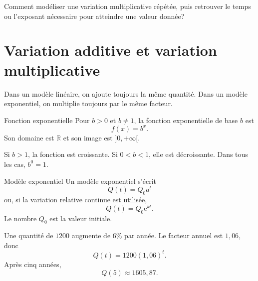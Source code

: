\documentclass[12pt,a4paper,openany]{book}
\newcommand{\R}{\mathbb{R}}
\newcommand{\e}{\mathrm{e}}
\begin{document}
\begin{questionbox}
Comment modéliser une variation multiplicative répétée, puis retrouver le temps ou l'exposant nécessaire pour atteindre une valeur donnée?
\end{questionbox}

\section{Variation additive et variation multiplicative}

\begin{intuitionbox}
Dans un modèle linéaire, on ajoute toujours la même quantité. Dans un modèle exponentiel, on multiplie toujours par le même facteur.
\end{intuitionbox}

\begin{definition}{Fonction exponentielle}{}
Pour $b>0$ et $b\neq1$, la fonction exponentielle de base $b$ est
\[
f(x)=b^x.
\]
Son domaine est $\R$ et son image est $]0,+\infty[$.
\end{definition}

Si $b>1$, la fonction est croissante. Si $0<b<1$, elle est décroissante. Dans tous les cas, $b^0=1$.

\begin{center}
\end{center}

\begin{definition}{Modèle exponentiel}{}
Un modèle exponentiel s'écrit
\[
Q(t)=Q_0a^t
\]
ou, si la variation relative continue est utilisée,
\[
Q(t)=Q_0\e^{kt}.
\]
Le nombre $Q_0$ est la valeur initiale.
\end{definition}

\begin{examplebox}
Une quantité de $1200$ augmente de $6\%$ par année. Le facteur annuel est $1{,}06$, donc
\[
Q(t)=1200(1{,}06)^t.
\]
Après cinq années,
\[
Q(5)\approx1605{,}87.
\]
\end{examplebox}
\end{document}
